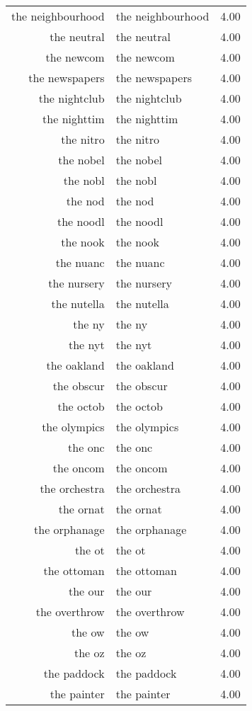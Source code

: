 \begin{table}[ht]
\begin{tabular}{rlr}
  the neighbourhood & the neighbourhood & 4.00 \\ 
  the neutral & the neutral & 4.00 \\ 
  the newcom & the newcom & 4.00 \\ 
  the newspapers & the newspapers & 4.00 \\ 
  the nightclub & the nightclub & 4.00 \\ 
  the nighttim & the nighttim & 4.00 \\ 
  the nitro & the nitro & 4.00 \\ 
  the nobel & the nobel & 4.00 \\ 
  the nobl & the nobl & 4.00 \\ 
  the nod & the nod & 4.00 \\ 
  the noodl & the noodl & 4.00 \\ 
  the nook & the nook & 4.00 \\ 
  the nuanc & the nuanc & 4.00 \\ 
  the nursery & the nursery & 4.00 \\ 
  the nutella & the nutella & 4.00 \\ 
  the ny & the ny & 4.00 \\ 
  the nyt & the nyt & 4.00 \\ 
  the oakland & the oakland & 4.00 \\ 
  the obscur & the obscur & 4.00 \\ 
  the octob & the octob & 4.00 \\ 
  the olympics & the olympics & 4.00 \\ 
  the onc & the onc & 4.00 \\ 
  the oncom & the oncom & 4.00 \\ 
  the orchestra & the orchestra & 4.00 \\ 
  the ornat & the ornat & 4.00 \\ 
  the orphanage & the orphanage & 4.00 \\ 
  the ot & the ot & 4.00 \\ 
  the ottoman & the ottoman & 4.00 \\ 
  the our & the our & 4.00 \\ 
  the overthrow & the overthrow & 4.00 \\ 
  the ow & the ow & 4.00 \\ 
  the oz & the oz & 4.00 \\ 
  the paddock & the paddock & 4.00 \\ 
  the painter & the painter & 4.00 \\ 

\end{tabular}
\end{table}
